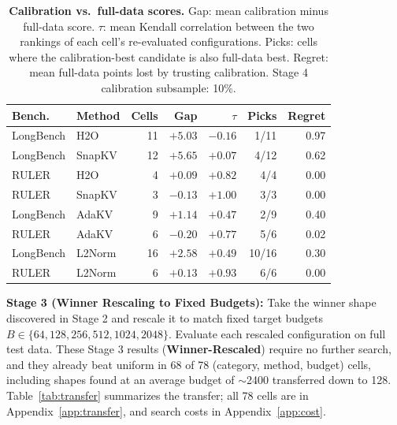 \documentclass[11pt]{article}
\begin{document}
\begin{table}[htbp]
  \centering
  \footnotesize
  \setlength{\tabcolsep}{2.5pt}
  \begin{tabular}{@{} l l r r r r r @{}}
    \toprule
    \textbf{Bench.} & \textbf{Method} & \textbf{Cells} & \textbf{Gap} & \textbf{$\tau$} & \textbf{Picks} & \textbf{Regret} \\
    \midrule
    \rowcolor{gray!10}
    LongBench & H2O    & 11 & $+5.03$ & $-0.16$ & 1/11 & 0.97 \\
    LongBench & SnapKV & 12 & $+5.65$ & $+0.07$ & 4/12 & 0.62 \\
    \rowcolor{gray!10}
    RULER     & H2O    & 4  & $+0.09$ & $+0.82$ & 4/4  & 0.00 \\
    RULER     & SnapKV & 3  & $-0.13$ & $+1.00$ & 3/3  & 0.00 \\
    \midrule
    \rowcolor{gray!10}
    LongBench & AdaKV & 9 & $+1.14$ & $+0.47$ & 2/9 & 0.40 \\
    RULER     & AdaKV  & 6  & $-0.20$ & $+0.77$ & 5/6  & 0.02 \\
    \midrule
    \rowcolor{gray!10}
    LongBench & L2Norm & 16 & $+2.58$ & $+0.49$ & 10/16 & 0.30 \\
    RULER     & L2Norm & 6  & $+0.13$ & $+0.93$ & 6/6   & 0.00 \\
    \bottomrule
  \end{tabular}
  \caption{\textbf{Calibration vs.\ full-data scores.} Gap: mean calibration minus full-data score. $\tau$: mean Kendall correlation between the two rankings of each cell's re-evaluated configurations. Picks: cells where the calibration-best candidate is also full-data best. Regret: mean full-data points lost by trusting calibration. Stage 4 calibration subsample: 10\%.}
  \label{tab:calib}
\end{table}

\textbf{Stage 3 (Winner Rescaling to Fixed Budgets):} Take the winner shape discovered in Stage 2 and rescale it to match fixed target budgets $B \in \{64, 128, 256, 512, 1024, 2048\}$. Evaluate each rescaled configuration on full test data. These Stage 3 results (\textbf{Winner-Rescaled}) require no further search, and they already beat uniform in 68 of 78 (category, method, budget) cells, including shapes found at an average budget of $\sim$2400 transferred down to 128. Table~\ref{tab:transfer} summarizes the transfer; all 78 cells are in Appendix~\ref{app:transfer}, and search costs in Appendix~\ref{app:cost}.
\end{document}
